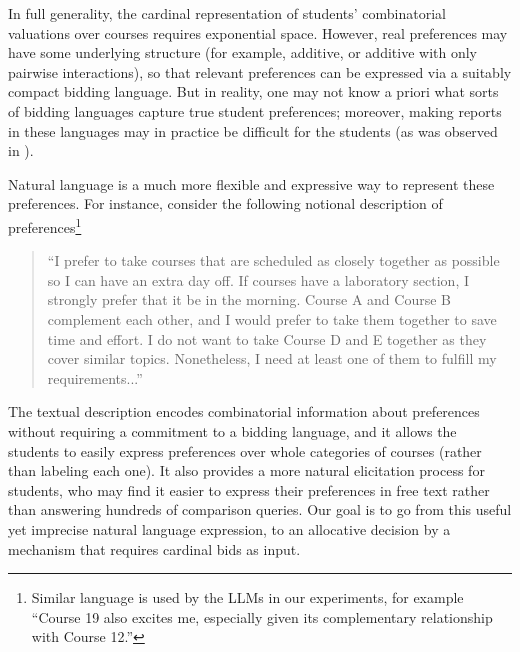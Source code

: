 In full generality, the cardinal representation of students' combinatorial valuations over courses requires exponential space. However, real preferences may have some underlying structure (for example, additive, or additive with only pairwise interactions), so that relevant preferences can be expressed via a suitably compact bidding language.
But in reality, one may not know a priori what sorts of bidding languages capture true student preferences; moreover, making reports in these languages may in practice be difficult for the students (as was observed in \citet{budish2021can}).

Natural language is a much more flexible and expressive way to represent these preferences. For instance, consider the following notional description of preferences\footnote{
Similar language is used by the LLMs in our experiments, for example
``Course 19 also excites me, especially given its complementary relationship with Course 12.''
}
\begin{quote}
``I prefer to take courses that are scheduled as closely together as possible so I can have an extra day off. If courses have a laboratory section, I strongly prefer that it be in the morning. Course A and Course B complement each other, and I would prefer to take them together to save time and effort. I do not want to take Course D and E together as they cover similar topics. Nonetheless, I need at least one of them to fulfill my requirements...''
\end{quote}
The textual description encodes combinatorial information about preferences without requiring a commitment to a bidding language, and it allows the students to easily express preferences over whole categories of courses (rather than labeling each one). It also provides a more natural elicitation process for students, who may find it easier to express their preferences in free text rather than answering hundreds of comparison queries. Our goal is to go from this useful yet imprecise natural language expression, to an allocative decision by a mechanism that requires cardinal bids as input.
